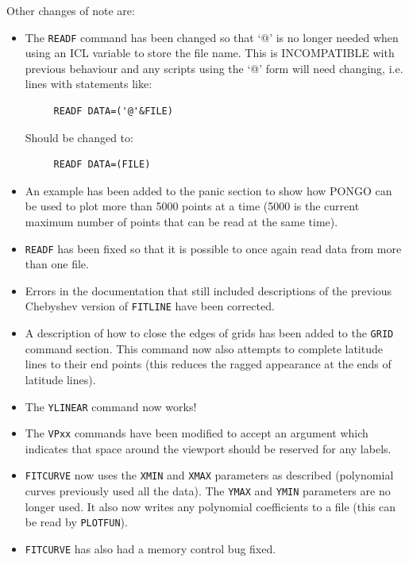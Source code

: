 \documentclass[twoside,11pt]{article}
\newcommand{\htmlref}[2]{#1}
\renewcommand{\_}{\texttt{\symbol{95}}}
\newcommand{\pnam}[1]{{\tt #1}}
\newcommand{\cnam}[1]{{\tt #1}}
\newcommand{\iref} [1]{\htmlref{#1}{#1}}
\begin{document}
Other changes of note are:
\begin{itemize}
\item The \cnam{\iref{READF}} command has been changed so that `@' is no
longer needed when using an ICL variable to store the file name. This
is INCOMPATIBLE with previous behaviour and any scripts using the `@'
form will need changing, i.e. lines with statements like:
\begin{verbatim}
     READF DATA=('@'&FILE)
\end{verbatim}
  Should be changed to:
\begin{verbatim}
     READF DATA=(FILE)
\end{verbatim}

\item An example has been added to the panic section to show how
PONGO can be used to plot more than 5000 points at a time (5000 is
the current maximum number of points that can be read at the same
time).

\item \cnam{READF} has been fixed so that it is possible to once again
read data from more than one file.

\item Errors in the documentation that still included descriptions of the
previous Chebyshev version of \cnam{\iref{FITLINE}} have been corrected.

\item A description of how to close the edges of grids has been added to
the \cnam{\iref{GRID}} command section. This command now also
attempts to complete latitude lines to their end points (this reduces
the ragged appearance at the ends of latitude lines).

\item The \cnam{\iref{YLINEAR}} command now works!

\item The \cnam{VP\_xx} commands have been modified to accept an
argument which indicates that space around the viewport should be reserved for
any labels.

\item \cnam{\iref{FITCURVE}} now uses the \pnam{XMIN} and \pnam{XMAX}
parameters as described (polynomial curves previously used all the
data). The \pnam{YMAX} and \pnam{YMIN} parameters are no longer used.
It also now writes any polynomial coefficients to a file (this can be
read by \cnam{\iref{PLOTFUN}}).

\item \cnam{FITCURVE} has also had a memory control bug fixed.


\end{itemize}
\end{document}
